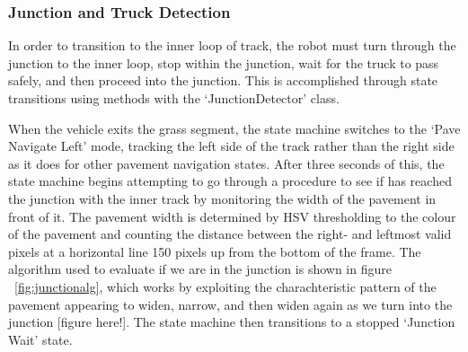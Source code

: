 \documentclass[titlepage]{article}
\begin{document}
        \subsubsection{Junction and Truck Detection}
            In order to transition to the inner loop of track, the robot must turn through the junction to the inner loop, stop within the junction, wait for the truck to pass safely, and then proceed into the junction. This is accomplished through state transitions using methods with the `JunctionDetector' class.

            When the vehicle exits the grass segment, the state machine switches to the `Pave Navigate Left' mode, tracking the left side of the track rather than the right side as it does for other pavement navigation states. After three seconds of this, the state machine begins attempting to go through a procedure to see if has reached the junction with the inner track by monitoring the width of the pavement in front of it. The pavement width is determined by HSV thresholding to the colour of the pavement and counting the distance between the right- and leftmost valid pixels at a horizontal line 150 pixels up from the bottom of the frame. The algorithm used to evaluate if we are in the junction is shown in figure ~\ref{fig:junctionalg}, which works by exploiting the charachteristic pattern of the pavement appearing to widen, narrow, and then widen again as we turn into the junction [figure here!]. The state machine then transitions to a stopped `Junction Wait' state. 
\end{document}
